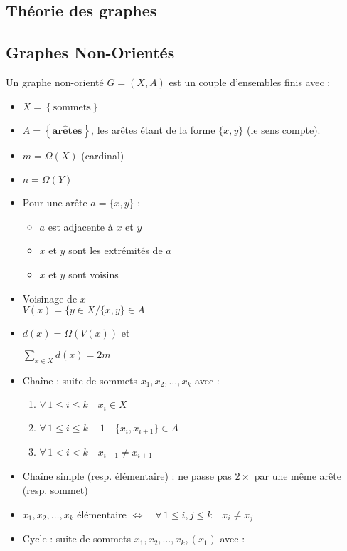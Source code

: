 \documentclass[a4paper, 8pt]{article}
\begin{document}
\begin{multicols*}{3}
\section*{Théorie des graphes}

\newcommand{\GXA}{$G = (X,A)$ }

\subsection*{Graphes Non-Orientés}
Un graphe non-orienté \GXA est un couple d'ensembles finis avec :
\begin{itemize}
\item $X = \left\{\text{sommets}\right\}$
\item $A = \left\{\mathbf{ar\hat{e}tes}\right\}$, les arêtes étant de la forme $\{x,y\}$ (le sens compte).
\item $m = \Omega(X)$ (cardinal)
\item $n = \Omega(Y)$
\item Pour une arête $a = \{x,y\}$ :
	\begin{itemize}
	\item $a$ est adjacente à $x$ et $y$
	\item $x$ et $y$ sont les extrémités de $a$
	\item $x$ et $y$ sont voisins
	\end{itemize}
\item Voisinage de $x$\\ $V(x) = \{y \in X / \{x,y\} \in A$
\item $d(x) = \Omega(V(x))$ et \begin{flushright}
$\sum_{x\in X}{d(x)} = 2m$
\end{flushright}
\item Chaîne : suite de sommets $x_1,x_2,\hdots,x_k$ avec :
\begin{enumerate}
\item $\forall \, 1\leqslant i \leqslant k \quad  x_i \in X$
\item $\forall \, 1\leqslant i \leqslant k-1 \quad \{x_i,x_{i+1}\} \in A$
\item $\forall \, 1< i< k \quad x_{i-1} \neq x_{i+1}$
\end{enumerate}
\item Chaîne simple (resp. élémentaire) : ne passe pas $2\times$ par une même arête (resp. sommet)
\item $x_1,x_2,\hdots,x_k$ élémentaire $\Longleftrightarrow \quad \forall \, 1\leqslant i,j \leqslant k \quad  x_i \neq x_j$
\item Cycle : suite de sommets $x_1,x_2,\hdots,x_k,(x_1)$ avec :

\end{itemize}
\end{multicols*}
\end{document}
